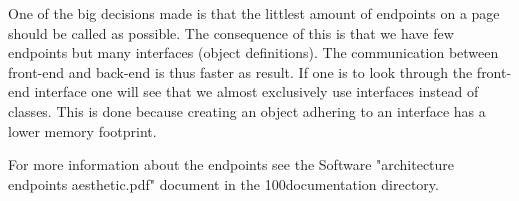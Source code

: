 One of the big decisions made is that the littlest amount of endpoints on a page should be called as possible. The consequence of this is that we have few endpoints but many interfaces (object definitions). The communication between front-end and back-end is thus faster as result. If one is to look through the front-end interface one will see that we almost exclusively use interfaces instead of classes. This is done because creating an object adhering to an interface has a lower memory footprint.

For more information about the endpoints see the Software "architecture endpoints aesthetic.pdf" document in the 100documentation directory.